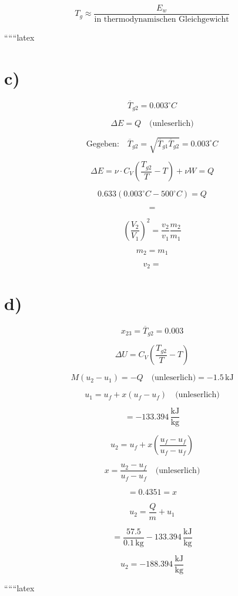 \[
T_{g} \approx \frac{E_w}{\text{in thermodynamischen Gleichgewicht}}
\]

``````latex


\section*{c)}

\[
\overline{T}_{g2} = 0.003^\circ C
\]


\[
\Delta E = Q \quad \text{(unleserlich)}
\]

\[
\text{Gegeben:} \quad \overline{T}_{g2} = \sqrt{\overline{T}_{g1} \overline{T}_{g2}} = 0.003^\circ C
\]

\[
\Delta E = \nu \cdot C_V \left( \frac{T_{g2}}{T} - T \right) + \nu W = Q
\]

\[
0.633 (0.003^\circ C - 500^\circ C) = Q
\]

\[
=
\]

\[
\left( \frac{V_2}{V_1} \right)^2 = \frac{v_2}{v_1} \frac{m_2}{m_1}
\]

\[
m_2 = m_1
\]

\[
v_2 =
\]

\section*{d)}

\[
x_{23} = \overline{T}_{g2} = 0.003
\]


\[
\Delta U = C_V \left( \frac{T_{g2}}{T} - T \right)
\]

\[
M (u_2 - u_1) = -Q \quad \text{(unleserlich)} = -1.5 \, \text{kJ}
\]

\[
u_1 = u_f + x (u_f - u_f) \quad \text{(unleserlich)}
\]

\[
= -133.394 \, \frac{\text{kJ}}{\text{kg}}
\]

\[
u_2 = u_f + x \left( \frac{u_f - u_f}{u_f - u_f} \right)
\]

\[
x = \frac{u_2 - u_f}{u_f - u_f} \quad \text{(unleserlich)}
\]

\[
= 0.4351 = x
\]

\[
u_2 = \frac{Q}{m} + u_1
\]

\[
= \frac{57.5}{0.1 \, \text{kg}} - 133.394 \, \frac{\text{kJ}}{\text{kg}}
\]

\[
u_2 = -188.394 \, \frac{\text{kJ}}{\text{kg}}
\]

``````latex


